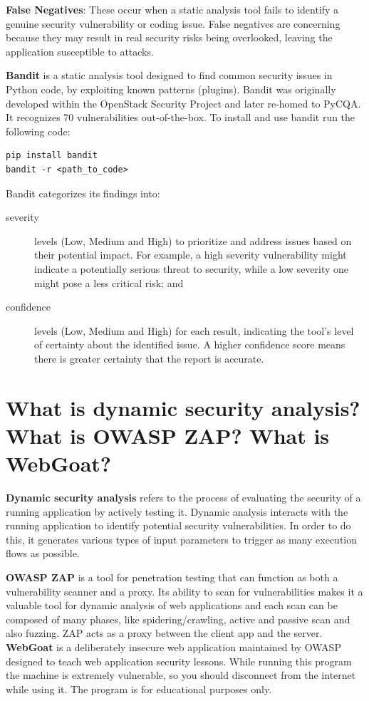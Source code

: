 \textbf{False Negatives}: These occur when a static analysis tool fails to identify a genuine security vulnerability or coding issue. False negatives are concerning because they may result in real security risks being overlooked, leaving the application susceptible to attacks.

\textbf{Bandit} is a static analysis tool designed to find common security issues in Python code, by exploiting known patterns (plugins). Bandit was originally developed within the OpenStack Security Project and later re-homed to PyCQA. It recognizes 70 vulnerabilities out-of-the-box. To install and use bandit run the following code:
\begin{verbatim}
pip install bandit
bandit -r <path_to_code>
\end{verbatim}

Bandit categorizes its findings into:
\begin{description}
   \item[severity] levels (Low, Medium and High) to prioritize and address issues based on their potential impact.  For example, a high severity vulnerability might indicate a potentially serious threat to security, while a low severity one might pose a less critical risk; and
   \item[confidence] levels (Low, Medium and High) for each result, indicating the tool's level of certainty about the identified issue. A higher confidence score means there is greater certainty that the report is accurate.
\end{description}
\section{What is dynamic security analysis? What is OWASP ZAP? What is WebGoat?}

\textbf{Dynamic security analysis} refers to the process of evaluating the security of a running application by actively testing it. Dynamic analysis interacts with the running application to identify potential security vulnerabilities. In order to do this, it generates various types of input parameters to trigger as many execution flows as possible. \nl

\textbf{OWASP ZAP} is a tool for penetration testing that can function as both a vulnerability scanner and a proxy. Its ability to scan for vulnerabilities makes it a valuable tool for dynamic analysis of web applications and each scan can be composed of many phases, like spidering/crawling, active and passive scan and also fuzzing. ZAP acts as a proxy between the client app and the server. \nl
\textbf{WebGoat} is a deliberately insecure web application maintained by OWASP designed to teach web application security lessons. While running this program the machine is extremely vulnerable, so you should disconnect from the internet while using it.
The program is for educational purposes only.

